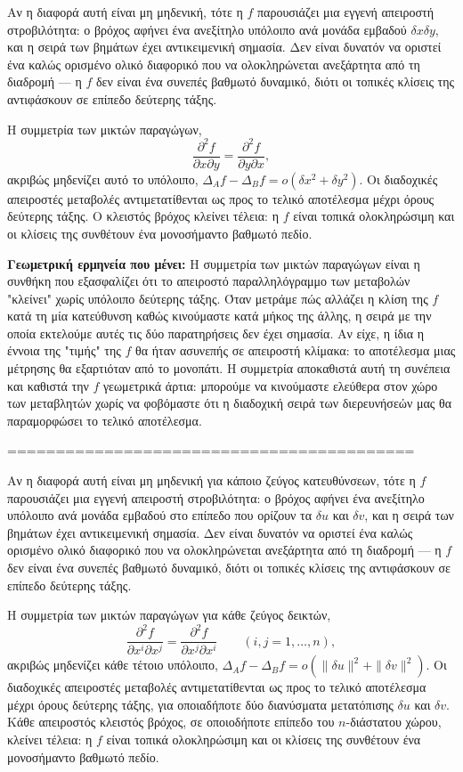 \documentclass[11pt,a4paper,twoside,openright]{book}
\begin{document}
Αν η διαφορά αυτή είναι μη μηδενική, τότε η \(f\) παρουσιάζει μια εγγενή απειροστή στροβιλότητα: ο βρόχος αφήνει ένα ανεξίτηλο υπόλοιπο ανά μονάδα εμβαδού \(\delta x \delta y\), και η σειρά των βημάτων έχει αντικειμενική σημασία. Δεν είναι δυνατόν να οριστεί ένα καλώς ορισμένο ολικό διαφορικό που να ολοκληρώνεται ανεξάρτητα από τη διαδρομή --- η \(f\) δεν είναι ένα συνεπές βαθμωτό δυναμικό, διότι οι τοπικές κλίσεις της αντιφάσκουν σε επίπεδο δεύτερης τάξης.

Η συμμετρία των μικτών παραγώγων,
\begin{equation}
\frac{\partial^2 f}{\partial x \partial y} = \frac{\partial^2 f}{\partial y \partial x},
\end{equation}
ακριβώς μηδενίζει αυτό το υπόλοιπο, \(\Delta_A f - \Delta_B f = o(\delta x^2 + \delta y^2)\). Οι διαδοχικές απειροστές μεταβολές αντιμετατίθενται ως προς το τελικό αποτέλεσμα μέχρι όρους δεύτερης τάξης. Ο κλειστός βρόχος κλείνει τέλεια: η \(f\) είναι τοπικά ολοκληρώσιμη και οι κλίσεις της συνθέτουν ένα μονοσήμαντο βαθμωτό πεδίο.

\textbf{Γεωμετρική ερμηνεία που μένει:} Η συμμετρία των μικτών παραγώγων είναι η συνθήκη που εξασφαλίζει ότι το απειροστό παραλληλόγραμμο των μεταβολών "κλείνει" χωρίς υπόλοιπο δεύτερης τάξης. Όταν μετράμε πώς αλλάζει η κλίση της \(f\) κατά τη μία κατεύθυνση καθώς κινούμαστε κατά μήκος της άλλης, η σειρά με την οποία εκτελούμε αυτές τις δύο παρατηρήσεις δεν έχει σημασία. Αν είχε, η ίδια η έννοια της "τιμής" της \(f\) θα ήταν ασυνεπής σε απειροστή κλίμακα: το αποτέλεσμα μιας μέτρησης θα εξαρτιόταν από το μονοπάτι. Η συμμετρία αποκαθιστά αυτή τη συνέπεια και καθιστά την \(f\) γεωμετρικά άρτια: μπορούμε να κινούμαστε ελεύθερα στον χώρο των μεταβλητών χωρίς να φοβόμαστε ότι η διαδοχική σειρά των διερευνήσεών μας θα παραμορφώσει το τελικό αποτέλεσμα.

==========================================

Αν η διαφορά αυτή είναι μη μηδενική για κάποιο ζεύγος κατευθύνσεων, τότε η \(f\) παρουσιάζει μια εγγενή απειροστή στροβιλότητα: ο βρόχος αφήνει ένα ανεξίτηλο υπόλοιπο ανά μονάδα εμβαδού στο επίπεδο που ορίζουν τα \(\delta u\) και \(\delta v\), και η σειρά των βημάτων έχει αντικειμενική σημασία. Δεν είναι δυνατόν να οριστεί ένα καλώς ορισμένο ολικό διαφορικό που να ολοκληρώνεται ανεξάρτητα από τη διαδρομή --- η \(f\) δεν είναι ένα συνεπές βαθμωτό δυναμικό, διότι οι τοπικές κλίσεις της αντιφάσκουν σε επίπεδο δεύτερης τάξης.

Η συμμετρία των μικτών παραγώγων για κάθε ζεύγος δεικτών,
\begin{equation}
\frac{\partial^2 f}{\partial x^i \partial x^j} = \frac{\partial^2 f}{\partial x^j \partial x^i} \qquad (i, j = 1, \dots, n),
\end{equation}
ακριβώς μηδενίζει κάθε τέτοιο υπόλοιπο, \(\Delta_A f - \Delta_B f = o(\|\delta u\|^2 + \|\delta v\|^2)\). Οι διαδοχικές απειροστές μεταβολές αντιμετατίθενται ως προς το τελικό αποτέλεσμα μέχρι όρους δεύτερης τάξης, για οποιαδήποτε δύο διανύσματα μετατόπισης \(\delta u\) και \(\delta v\). Κάθε απειροστός κλειστός βρόχος, σε οποιοδήποτε επίπεδο του \(n\)-διάστατου χώρου, κλείνει τέλεια: η \(f\) είναι τοπικά ολοκληρώσιμη και οι κλίσεις της συνθέτουν ένα μονοσήμαντο βαθμωτό πεδίο.
\end{document}
